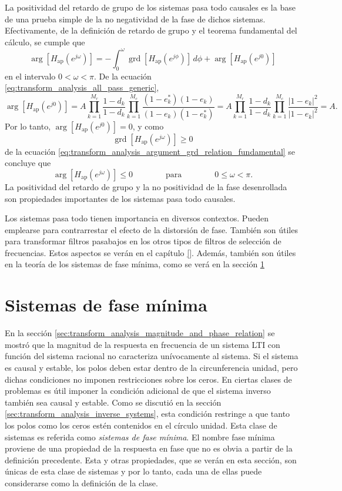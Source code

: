 \documentclass[a4paper]{report}
\DeclareMathOperator{\grd}{grd}
\begin{document}
La positividad del retardo de grupo de los sistemas pasa todo causales es la base de una prueba simple de la no negatividad de la fase de dichos sistemas. Efectivamente, de la definición de retardo de grupo y el teorema fundamental del cálculo, se cumple que 
\begin{equation}\label{eq:transform_analysis_argument_grd_relation_fundamental}
 \arg[H_\textrm{ap}(e^{j\omega})]=-\int_0^\omega\grd[H_\textrm{ap}(e^{j\phi})]\,d\phi+\arg[H_\textrm{ap}(e^{j0})] 
\end{equation}
en el intervalo \(0<\omega<\pi\). De la ecuación \ref{eq:transform_analysis_all_pass_generic},
\[
 \arg[H_\textrm{ap}(e^{j0})]=A\prod_{k=1}^{M_r}\frac{1-d_k}{1-d_k}\prod_{k=1}^{M_c}\frac{(1-e_k^*)(1-e_k)}{(1-e_k)(1-e^*_k)}=A\prod_{k=1}^{M_r}\frac{1-d_k}{1-d_k}\prod_{k=1}^{M_c}\frac{|1-e_k|^2}{|1-e_k|^2}=A.
\]
Por lo tanto, \(\arg[H_\textrm{ap}(e^{j0})]=0\), y como
\[
 \grd[H_\textrm{ap}(e^{j\omega})]\geq0
\]
de la ecuación \ref{eq:transform_analysis_argument_grd_relation_fundamental} se concluye que 
\[
 \arg[H_\textrm{ap}(e^{j\omega})]\leq0
 \qquad\qquad\textrm{para}\qquad\qquad
 0\leq\omega<\pi.
\]
La positividad del retardo de grupo y la no positividad de la fase desenrollada son propiedades importantes de los sistemas pasa todo causales.

Los sistemas pasa todo tienen importancia en diversos contextos. Pueden emplearse para contrarrestar el efecto de la distorsión de fase. También son útiles para transformar filtros pasabajos en los otros tipos de filtros de selección de frecuencias. Estos aspectos se verán en el capítulo \ref{}. Además, también son útiles en la teoría de los sistemas de fase mínima, como se verá en la sección \ref{sec:transform_analysis_minimum_phase_systems}

\section{Sistemas de fase mínima}\label{sec:transform_analysis_minimum_phase_systems}

En la sección \ref{sec:transform_analysis_magnitude_and_phase_relation} se mostró que la magnitud de la respuesta en frecuencia de un sistema LTI con función del sistema racional no caracteriza unívocamente al sistema. Si el sistema es causal y estable, los polos deben estar dentro de la circunferencia unidad, pero dichas condiciones no imponen restricciones sobre los ceros. En ciertas clases de problemas es útil imponer la condición adicional de que el sistema inverso también sea causal y estable. Como se discutió en la sección \ref{sec:transform_analysis_inverse_systems}, esta condición restringe a que tanto los polos como los ceros estén contenidos en el círculo unidad. Esta clase de sistemas es referida como \emph{sistemas de fase mínima}. El nombre fase mínima proviene de una propiedad de la respuesta en fase que no es obvia a partir de la definición precedente. Esta y otras propiedades, que se verán en esta sección, son únicas de esta clase de sistemas y por lo tanto, cada una de ellas puede considerarse como la definición de la clase.
\end{document}
